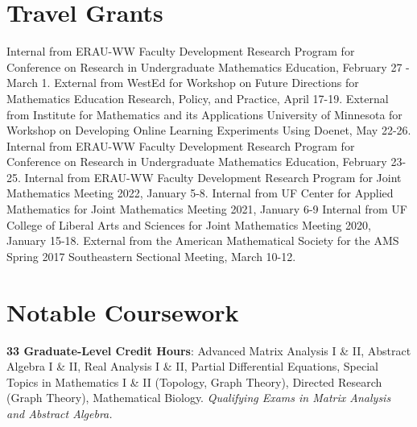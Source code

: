 \documentclass[10pt,a4paper,sans]{moderncv}
\begin{document}
\section{Travel Grants}
		{Internal}
		{}
		{from ERAU-WW Faculty Development Research Program for Conference on Research in Undergraduate Mathematics Education, February 27 - March 1.}
		{}{}
		{External}
		{}
		{from WestEd for Workshop on Future Directions for Mathematics Education Research, Policy, and Practice, April 17-19.}
		{}{}
		{External}
		{}
		{from Institute for Mathematics and its Applications University of Minnesota for Workshop on Developing Online Learning Experiments Using Doenet, May 22-26.}
		{}{}
		{Internal}
		{}
		{from ERAU-WW Faculty Development Research Program for Conference on Research in Undergraduate Mathematics Education, February 23-25.}
		{}{}
		{Internal}
		{}
		{from ERAU-WW Faculty Development Research Program for Joint Mathematics Meeting 2022, January 5-8.}
		{}{}
		{Internal}
		{}
		{from UF Center for Applied Mathematics for Joint Mathematics Meeting 2021, January 6-9}
		{}{}
		{Internal}
		{}
		{from UF College of Liberal Arts and Sciences for Joint Mathematics Meeting 2020, January 15-18.}
		{}{}
		{External}
		{}
		{from the American Mathematical Society for the AMS Spring 2017 Southeastern Sectional Meeting, March 10-12.}
		{}{}





\section{Notable Coursework}
		{\textbf{33 Graduate-Level Credit Hours}: Advanced Matrix Analysis I \& II, Abstract Algebra I \& II, Real Analysis I \& II,  Partial Differential Equations, Special Topics in Mathematics I \& II (Topology, Graph Theory), Directed Research (Graph Theory), Mathematical Biology. \textit{Qualifying Exams in Matrix Analysis and Abstract Algebra.} }
\end{document}
